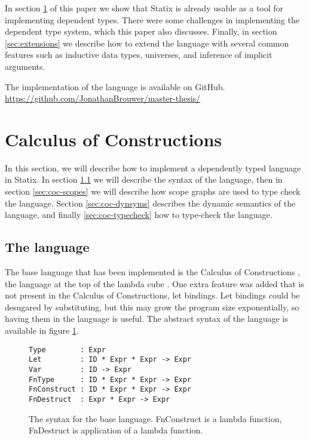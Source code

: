 \documentclass[a4paper,UKenglish,cleveref, autoref, thm-restate]{oasics-v2021}
\begin{document}
In section \ref{sec:coc} of this paper we show that Statix is already usable as a tool for implementing dependent types. There were some challenges in implementing the dependent type system, which this paper also discusses. Finally, in section \ref{sec:extensions} we describe how to extend the language with several common features such as inductive data types, universes, and inference of implicit arguments.

The implementation of the language is available on GitHub.\\
\url{https://github.com/JonathanBrouwer/master-thesis/}

\section{Calculus of Constructions}
\label{sec:coc}

In this section, we will describe how to implement a dependently typed language in Statix. In section \ref{sec:coc-syntax} we will describe the syntax of the language, then in section \ref{sec:coc-scopes} we will describe how scope graphs are used to type check the language. Section \ref{sec:coc-dynsyms} describes the dynamic semantics of the language, and finally \ref{sec:coc-typecheck} how to type-check the language.

\subsection{The language}
\label{sec:coc-syntax}

The base language that has been implemented is the Calculus of Constructions \cite{Coquand_Huet_1988}, the language at the top of the lambda cube \cite{lambda_cube}. One extra feature was added that is not present in the Calculus of Constructions, let bindings. Let bindings could be desugared by substituting, but this may grow the program size exponentially, so having them in the language is useful. The abstract syntax of the language is available in figure \ref{fig:syntax}.

\begin{figure}[h]
\begin{lstlisting}
Type        : Expr
Let         : ID * Expr * Expr -> Expr
Var         : ID -> Expr
FnType      : ID * Expr * Expr -> Expr
FnConstruct : ID * Expr * Expr -> Expr
FnDestruct  : Expr * Expr -> Expr
\end{lstlisting}
\caption{The syntax for the base language. FnConstruct is a lambda function, FnDestruct is application of a lambda function.}
\label{fig:syntax}
\end{figure}
\end{document}
